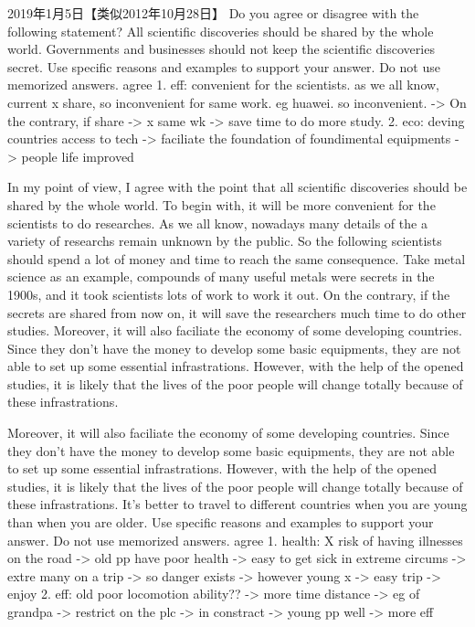 2019年1月5日【类似2012年10月28日】
Do you agree or disagree with the following statement?
All scientific discoveries should be shared by the whole world. Governments and businesses should not keep the scientific discoveries secret.
Use specific reasons and examples to support your answer. Do not use memorized answers.
agree
1. eff: convenient for the scientists. as we all know, current x share, so inconvenient for same work. eg huawei. so inconvenient. -> On the contrary, if share -> x same wk -> save time to do more study.
2. eco: deving countries access to tech -> faciliate the foundation of foundimental equipments -> people life improved

In my point of view, I agree with the point that all scientific discoveries should be shared by the whole world.
To begin with, it will be more convenient for the scientists to do researches. As we all know, nowadays many details of the a variety of researchs remain unknown by the public. So the following scientists should spend a lot of money and time to reach the same consequence. Take metal science as an example, compounds of many useful metals were secrets in the 1900s, and it took scientists lots of work to work it out. On the contrary, if the secrets are shared from now on, it will save the researchers much time to do other studies.
Moreover, it will also faciliate the economy of some developing countries. Since they don't have the money to develop some basic equipments, they are not able to set up some essential infrastrations. However, with the help of the opened studies, it is likely that the lives of the poor people will change totally because of these infrastrations.

Moreover, it will also faciliate the economy of some developing countries. Since they don't have the money to develop some basic equipments, they are not able to set up some essential infrastrations. However, with the help of the opened studies, it is likely that the lives of the poor people will change totally because of these infrastrations.
It’s better to travel to different countries when you are young than when you are older.
Use specific reasons and examples to support your answer. Do not use memorized answers.
agree
1. health: X risk of having illnesses on the road -> old pp have poor health -> easy to get sick in extreme circums -> extre many on a trip -> so danger exists -> however young x -> easy trip -> enjoy
2. eff: old poor locomotion ability?? -> more time distance -> eg of grandpa -> restrict on the plc -> in constract -> young pp well -> more eff

